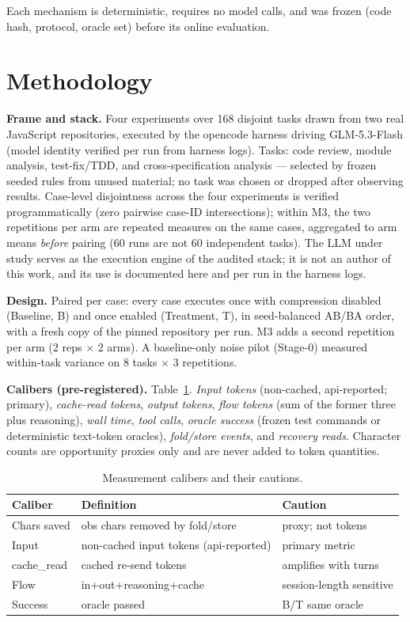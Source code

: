\documentclass[twocolumn]{svjour3}       %
\begin{document}
Each mechanism is deterministic, requires no model calls, and was frozen (code hash,
protocol, oracle set) before its online evaluation.

\section{Methodology}
\label{sec:method}

\textbf{Frame and stack.} Four experiments over 168 disjoint tasks drawn from two real
JavaScript repositories, executed by the opencode harness \cite{opencode2026} driving
GLM-5.3-Flash (model identity verified per run from harness logs). Tasks: code review,
module analysis, test-fix/TDD, and cross-specification analysis --- selected by frozen
seeded rules from unused material; no task was chosen or dropped after observing
results. Case-level disjointness across the four experiments is verified programmatically
(zero pairwise case-ID intersections); within M3, the two repetitions per arm are
repeated measures on the same cases, aggregated to arm means \emph{before} pairing (60
runs are not 60 independent tasks). The LLM under study serves as the execution engine
of the audited stack; it is not an author of this work, and its use is documented here
and per run in the harness logs.

\textbf{Design.} Paired per case: every case executes once with compression disabled
(Baseline, B) and once enabled (Treatment, T), in seed-balanced AB/BA order, with a fresh
copy of the pinned repository per run. M3 adds a second repetition per arm (2 reps
$\times$ 2 arms). A baseline-only noise pilot (Stage-0) measured within-task variance on
8 tasks $\times$ 3 repetitions.

\textbf{Calibers (pre-registered).} Table~\ref{tab:calibers}. \emph{Input tokens}
(non-cached, api-reported; primary), \emph{cache-read tokens}, \emph{output tokens},
\emph{flow tokens} (sum of the former three plus reasoning), \emph{wall time}, \emph{tool
calls}, \emph{oracle success} (frozen test commands or deterministic text-token oracles),
\emph{fold/store events}, and \emph{recovery reads}. Character counts are opportunity
proxies only and are never added to token quantities.

\begin{table}[t]
\centering\small
\caption{Measurement calibers and their cautions.}
\label{tab:calibers}
\begin{tabular}{@{}p{1.9cm}p{3.6cm}p{2.1cm}@{}}
\toprule
Caliber & Definition & Caution \\
\midrule
Chars saved & obs chars removed by fold/store & proxy; not tokens \\
Input & non-cached input tokens (api-reported) & primary metric \\
cache\_read & cached re-send tokens & amplifies with turns \\
Flow & in+out+\allowbreak reasoning+\allowbreak cache & session-length sensitive \\
Success & oracle passed & B/T same oracle \\
\bottomrule
\end{tabular}
\end{table}
\end{document}
